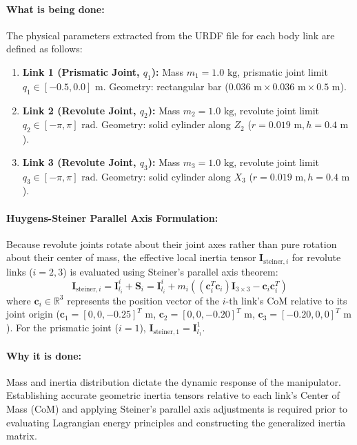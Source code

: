 \documentclass[11pt, a4paper]{article}
\begin{document}
\paragraph{What is being done:}
The physical parameters extracted from the URDF file for each body link are defined as follows:
\begin{enumerate}[leftmargin=1.5em]
    \item \textbf{Link 1 (Prismatic Joint, $q_1$):} Mass $m_1 = 1.0\text{ kg}$, prismatic joint limit $q_1 \in [-0.5, 0.0]\text{ m}$. Geometry: rectangular bar ($0.036\text{ m} \times 0.036\text{ m} \times 0.5\text{ m}$).
    \item \textbf{Link 2 (Revolute Joint, $q_2$):} Mass $m_2 = 1.0\text{ kg}$, revolute joint limit $q_2 \in [-\pi, \pi]\text{ rad}$. Geometry: solid cylinder along $Z_2$ ($r = 0.019\text{ m}, h = 0.4\text{ m}$).
    \item \textbf{Link 3 (Revolute Joint, $q_3$):} Mass $m_3 = 1.0\text{ kg}$, revolute joint limit $q_3 \in [-\pi, \pi]\text{ rad}$. Geometry: solid cylinder along $X_3$ ($r = 0.019\text{ m}, h = 0.4\text{ m}$).
\end{enumerate}

\paragraph{Huygens-Steiner Parallel Axis Formulation:}
Because revolute joints rotate about their joint axes rather than pure rotation about their center of mass, the effective local inertia tensor $\mathbf{I}_{\text{steiner}, i}$ for revolute links ($i=2,3$) is evaluated using Steiner's parallel axis theorem:
\begin{equation}
    \mathbf{I}_{\text{steiner}, i} = \mathbf{I}_{l_i}^i + \mathbf{S}_i = \mathbf{I}_{l_i}^i + m_i \left( (\mathbf{c}_i^T \mathbf{c}_i) \mathbf{I}_{3\times3} - \mathbf{c}_i \mathbf{c}_i^T \right)
\end{equation}
where $\mathbf{c}_i \in \mathbb{R}^3$ represents the position vector of the $i$-th link's CoM relative to its joint origin ($\mathbf{c}_1 = [0, 0, -0.25]^T\text{ m}$, $\mathbf{c}_2 = [0, 0, -0.20]^T\text{ m}$, $\mathbf{c}_3 = [-0.20, 0, 0]^T\text{ m}$). For the prismatic joint ($i=1$), $\mathbf{I}_{\text{steiner}, 1} = \mathbf{I}_{l_1}^1$.

\paragraph{Why it is done:}
Mass and inertia distribution dictate the dynamic response of the manipulator. Establishing accurate geometric inertia tensors relative to each link's Center of Mass (CoM) and applying Steiner's parallel axis adjustments is required prior to evaluating Lagrangian energy principles and constructing the generalized inertia matrix.
\end{document}
